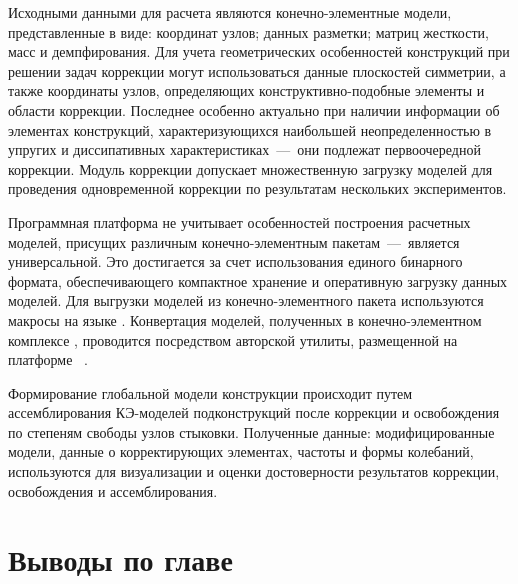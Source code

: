 Исходными данными для расчета являются конечно-элементные модели, представленные в виде: координат узлов; данных разметки; матриц жесткости, масс и демпфирования. Для учета геометрических особенностей конструкций при решении задач коррекции могут использоваться данные плоскостей симметрии, а также координаты узлов, определяющих конструктивно-подобные элементы и области коррекции. Последнее особенно актуально при наличии информации об элементах конструкций, характеризующихся наибольшей неопределенностью в упругих и диссипативных характеристиках~---~они подлежат первоочередной коррекции. Модуль коррекции допускает множественную загрузку моделей для проведения одновременной коррекции по результатам нескольких экспериментов.

Программная платформа не учитывает особенностей построения расчетных моделей, присущих различным конечно-элементным пакетам~---~является универсальной. Это достигается за счет использования единого бинарного формата, обеспечивающего компактное хранение и оперативную загрузку данных моделей. Для выгрузки моделей из конечно-элементного пакета  используются макросы на языке . Конвертация моделей, полученных в конечно-элементном комплексе , проводится посредством авторской утилиты, размещенной на платформе ~\cite{lib:author:github:pchConverter}. 

Формирование глобальной модели конструкции происходит путем ассемблирования КЭ-моделей подконструкций после коррекции и освобождения по степеням свободы узлов стыковки. Полученные данные: модифицированные модели, данные о корректирующих элементах, частоты и формы колебаний, используются для визуализации и оценки достоверности результатов коррекции, освобождения и ассемблирования. 

\section{Выводы по главе \thechapter}


